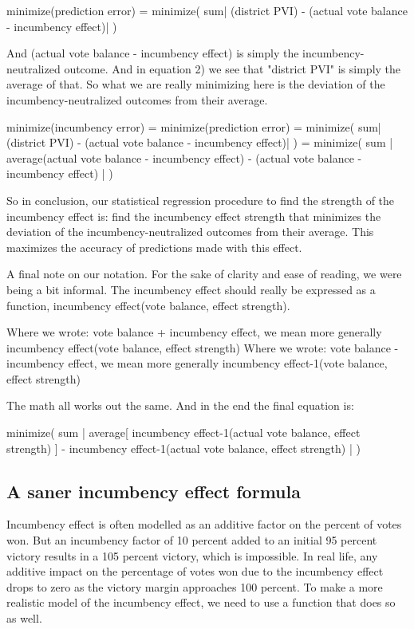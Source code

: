 \documentclass[preprint,12pt]{article}
\begin{document}
minimize(prediction error) = minimize( sum| (district PVI) - (actual vote balance - incumbency effect)| )

And (actual vote balance - incumbency effect) is simply the incumbency-neutralized outcome.  And in equation 2) we see that "district PVI" is simply the average of that.  So what we are really minimizing here is the deviation of the incumbency-neutralized outcomes from their average.

minimize(incumbency error) 
= minimize(prediction error) 
= minimize( sum| (district PVI) - (actual vote balance - incumbency effect)| ) 
= minimize( sum | average(actual vote balance - incumbency effect) - (actual vote balance - incumbency effect) | )

So in conclusion, our statistical regression procedure to find the strength of the incumbency effect is: find the incumbency effect strength that minimizes the deviation of the incumbency-neutralized outcomes from their average.  This maximizes the accuracy of predictions made with this effect.

A final note on our notation.  For the sake of clarity and ease of reading, we were being a bit informal.  The incumbency effect should really be expressed as a function, incumbency effect(vote balance, effect strength).  

Where we wrote: vote balance + incumbency effect, we mean more generally incumbency effect(vote balance, effect strength)
Where we wrote: vote balance - incumbency effect, we mean more generally incumbency effect-1(vote balance, effect strength)

The math all works out the same.  And in the end the final equation is:

minimize( sum | average[ incumbency effect-1(actual vote balance, effect strength) ] - incumbency effect-1(actual vote balance, effect strength) | )

\subsection{A saner incumbency effect formula}

Incumbency effect is often modelled as an additive factor on the percent of votes won.  But an incumbency factor of 10 percent added to an initial 95 percent victory results in a 105 percent victory, which is impossible.   In real life, any additive impact on the percentage of votes won due to the incumbency effect drops to zero as the victory margin approaches 100 percent.  To make a more realistic model of the incumbency effect, we need to use a function that does so as well.
\end{document}
